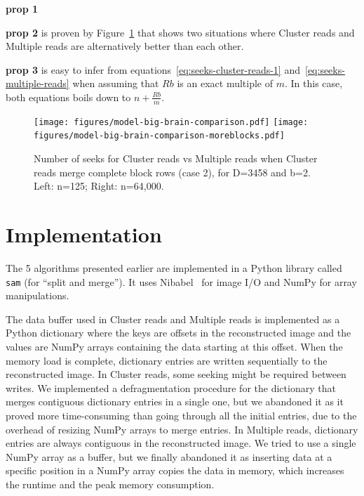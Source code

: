 \documentclass[10pt, conference, compsocconf]{IEEEtran}
\newcommand{\todo}[1]{\marginpar{\parbox{18mm}{\flushleft\tiny\color{red}\textbf{TODO}:
      #1}}}
\begin{document}
\textbf{prop 1} \todo{do it!}

 \textbf{prop 2} is proven by Figure~\ref{fig:model-comparison} that
 shows two situations where Cluster reads and Multiple reads are
 alternatively better than each other.

 \textbf{prop 3} is easy to infer from
 equations~\ref{eq:seeks-cluster-reads-1}
 and~\ref{eq:seeks-multiple-reads} when assuming that $Rb$ is an exact
 multiple of $m$. In this case, both equations boils down to
 $n+\frac{Rb}{m}$.

\begin{figure}
  \texttt{[image: figures/model-big-brain-comparison.pdf]}
  \texttt{[image: figures/model-big-brain-comparison-moreblocks.pdf]}
  \caption{Number of seeks for Cluster reads vs Multiple reads when
    Cluster reads merge complete block rows (case 2), for D=3458 and
    b=2. Left: n=125; Right: n=64,000.}
  \label{fig:model-comparison}
\end{figure}

\section{Implementation}
\label{sec:implementation}

The 5 algorithms presented earlier are implemented in a Python library
called \texttt{sam} (for ``split and merge''). It uses Nibabel~\cite{matthew_brett_2016_60808} for image I/O
and NumPy for array manipulations.

The data buffer used in Cluster reads and Multiple reads is
implemented as a Python dictionary where the keys are offsets in the
reconstructed image and the values are NumPy arrays containing the
data starting at this offset. When the memory load is complete,
dictionary entries are written sequentially to the reconstructed
image. In Cluster reads, some seeking might be required between
writes. We implemented a defragmentation procedure for the dictionary
that merges contiguous dictionary entries in a single one, but we
abandoned it as it proved more time-consuming than going through all
the initial entries, due to the overhead of resizing NumPy arrays to
merge entries. In Multiple reads, dictionary entries are always
contiguous in the reconstructed image.  We tried to use a single NumPy
array as a buffer, but we finally abandoned it as inserting data at a
specific position in a NumPy array copies the data in memory, which
increases the runtime and the peak memory consumption.
\end{document}
